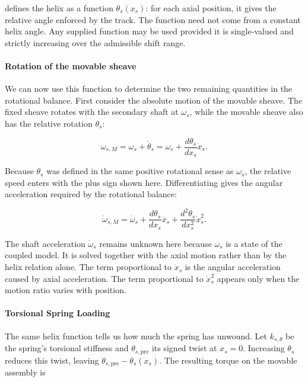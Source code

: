 \documentclass[11pt]{report}
\numberwithin{equation}{section}
\begin{document}
 defines the helix as a function
\(\theta_s(x_s)\): for each axial position, it gives the relative angle
enforced by the track. The function need not come from a constant helix angle. Any supplied function
may be used provided it is single-valued and strictly increasing over the
admissible shift range.

\paragraph{Rotation of the movable sheave} 
We can now use this function to determine the two remaining quantities in the
rotational balance. First consider the absolute motion of the movable sheave.
The fixed sheave rotates with the secondary shaft at \(\omega_s\), while the
movable sheave also has the relative rotation \(\theta_s\):

\begin{equation}
    \omega_{s,M}
    =
    \omega_s+\dot\theta_s
    =
    \omega_s
    +
    \frac{d\theta_s}{dx_s}\dot x_s.
    \label{eq:secondary_movable_sheave_speed}
\end{equation}

Because \(\theta_s\) was defined in the same positive rotational sense as
\(\omega_s\), the relative speed enters with the plus sign shown here.
Differentiating gives the angular acceleration required by the rotational
balance:

\begin{equation}
    \dot\omega_{s,M}
    =
    \dot\omega_s
    +
    \frac{d\theta_s}{dx_s}\ddot x_s
    +
    \frac{d^2\theta_s}{dx_s^2}\dot x_s^2.
    \label{eq:secondary_movable_sheave_acceleration}
\end{equation}

The shaft acceleration \(\dot\omega_s\) remains unknown here because
\(\omega_s\) is a state of the coupled model. It is solved together with
the axial motion rather than by the helix relation alone.
The term proportional to \(\ddot x_s\) is the angular acceleration caused by
axial acceleration. The term proportional to \(\dot x_s^2\) appears only when
the motion ratio varies with position.

\paragraph{Torsional Spring Loading}

The same helix function tells us how much the spring has unwound. Let
\(k_{s,\theta}\) be the spring's torsional stiffness and
\(\theta_{s,\mathrm{pre}}\) its signed twist at \(x_s=0\). Increasing
\(\theta_s\) reduces this twist, leaving
\(\theta_{s,\mathrm{pre}}-\theta_s(x_s)\). The resulting torque on the
movable assembly is
\end{document}
